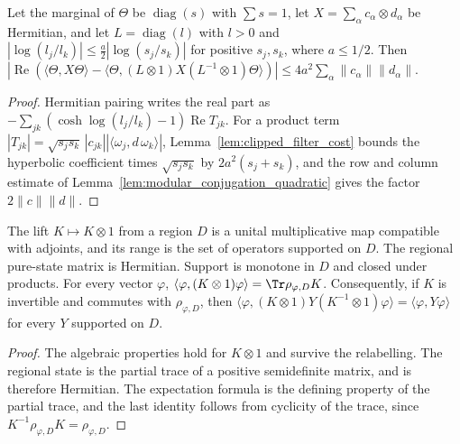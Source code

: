 \begin{lemma}
    \label{lem:filter_conjugation}
    \leanok
    Let the marginal of $\Theta$ be $\operatorname{diag}(s)$ with $\sum s=1$, let
    $X=\sum_\alpha c_\alpha\otimes d_\alpha$ be Hermitian, and let $L=
        \operatorname{diag}(l)$ with $l>0$ and
    $|\log(l_j/l_k)|\le\frac a2|\log(s_j/s_k)|$ for positive $s_j,s_k$, where
    $a\le1/2$. Then
    $|\operatorname{Re}(\langle\Theta,X\Theta\rangle-\langle\Theta,(L\otimes1)
        X(L^{-1}\otimes1)\Theta\rangle)|\le4a^2\sum_\alpha\lVert c_\alpha\rVert
        \lVert d_\alpha\rVert$.
\end{lemma}
\begin{proof}\leanok
    Hermitian pairing writes the real part as
    $-\sum_{jk}(\cosh\log(l_j/l_k)-1)\operatorname{Re}T_{jk}$. For a product
    term $|T_{jk}|=\sqrt{s_js_k}\,|c_{jk}||\langle\omega_j,d\,\omega_k\rangle|$,
    Lemma~\ref{lem:clipped_filter_cost} bounds the hyperbolic coefficient
    times $\sqrt{s_js_k}$ by $2a^2(s_j+s_k)$, and the row and column estimate
    of Lemma~\ref{lem:modular_conjugation_quadratic} gives the factor
    $2\lVert c\rVert\lVert d\rVert$.
\end{proof}

\begin{lemma}
    \label{lem:local_lift}
    \leanok
    The lift $K\mapsto K\otimes1$ from a region $D$ is a unital multiplicative
    map compatible with adjoints, and its range is the set of operators
    supported on $D$. The regional pure-state matrix is Hermitian. Support is
    monotone in $D$ and closed under products.
    For every vector $\varphi$, $\langle\varphi,(K\otimes1)\varphi\rangle=
        \Tr\rho_{\varphi,D}K$. Consequently, if $K$ is invertible and commutes with
    $\rho_{\varphi,D}$, then
    $\langle\varphi,(K\otimes1)Y(K^{-1}\otimes1)\varphi\rangle=\langle\varphi,
        Y\varphi\rangle$ for every $Y$ supported on $D$.
\end{lemma}
\begin{proof}\leanok
    The algebraic properties hold for $K\otimes1$ and survive the relabelling.
    The regional state is the partial trace of a positive semidefinite
    matrix, and is therefore Hermitian.
    The expectation formula is the defining property of the partial trace,
    and the last identity follows from cyclicity of the trace, since
    $K^{-1}\rho_{\varphi,D}K=\rho_{\varphi,D}$.
\end{proof}

